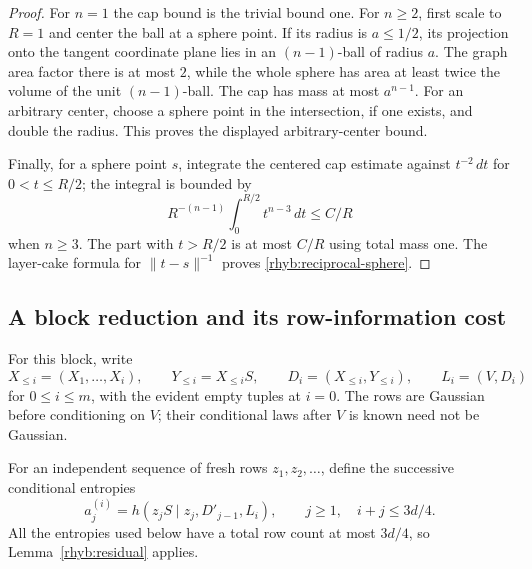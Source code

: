 \begin{proof}
For \(n=1\) the cap bound is the trivial bound one.  For \(n\ge2\), first
scale to \(R=1\) and center the ball at a
sphere point.  If its radius is \(a\le1/2\), its projection onto the
tangent coordinate plane lies in an \((n-1)\)-ball of radius \(a\).
The graph area factor there is at most \(2\), while the whole sphere
has area at least twice the volume of the unit \((n-1)\)-ball.
The cap has mass at most \(a^{n-1}\).  For an arbitrary center, choose a
sphere point in the intersection, if one exists, and double the radius.
This proves the displayed arbitrary-center bound.

Finally, for a sphere point \(s\), integrate the centered cap estimate
against \(t^{-2}\,dt\) for \(0<t\le R/2\); the integral is bounded by
\[
 R^{-(n-1)}\int_0^{R/2}t^{n-3}\,dt\le C/R
\]
when \(n\ge3\).  The part with \(t>R/2\) is at most \(C/R\) using total
mass one.  The layer-cake formula for \(\|t-s\|^{-1}\) proves
\eqref{rhyb:reciprocal-sphere}.
\end{proof}

\subsection{A block reduction and its row-information cost}

For this block, write
\[
 X_{\le i}=(X_1,\ldots,X_i),\qquad
 Y_{\le i}=X_{\le i}S,\qquad
 D_i=(X_{\le i},Y_{\le i}),\qquad L_i=(V,D_i)
\]
for \(0\le i\le m\), with the evident empty tuples at \(i=0\).
The rows are Gaussian before conditioning on \(V\); their conditional
laws after \(V\) is known need not be Gaussian.

For an independent sequence of fresh rows \(z_1,z_2,\ldots\), define the
successive conditional entropies
\begin{equation}\label{rhyb:slopes}
 a_j^{(i)}
 =h(z_jS\mid z_j,D'_{j-1},L_i),
 \qquad j\ge1,\quad i+j\le3d/4.
\end{equation}
All the entropies used below have a total row count at most \(3d/4\), so
Lemma~\ref{rhyb:residual} applies.

